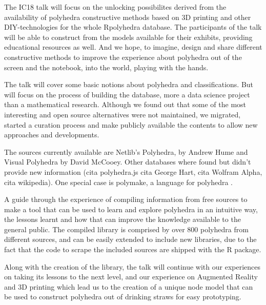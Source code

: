 \documentclass[a4paper,10pt]{article}
\begin{document}
The IC18 talk will focus on the unlocking possibilites derived from the availability of polyhedra constructive methods based on 3D printing and other DIY-technologies for the whole Rpolyhedra database. The participants of the talk will be able to construct from the models available for their exhibits, providing educational resources as well. And we hope, to imagine, design and share different constructive methods to improve the experience about polyhedra out of the screen and the notebook, into the world, playing with the hands.

The talk will cover some basic notions about polyhedra and classifications. But will focus on the process of building the database, more a data science project than a mathematical research. Although we found out that some of the most interesting and open source alternatives were not maintained, we migrated, started a curation process and make publicly available the contents to allow new approaches and developments.

The sources currently available are Netlib's Polyhedra\cite{NETLIB}, by Andrew Hume and Visual Polyhedra\cite{DMCCOOEY} by David McCooey. Other databases where found but didn't provide new information (cita polyhedra.js cita George Hart, cita Wolfram Alpha, cita wikipedia). One special case is polymake, a language for polyhedra .

A guide through the experience of compiling information from free sources to make a tool that can be used to learn and explore polyhedra in an intuitive way, the lessons learnt and how that can improve the knowledge available to the general public. The compiled library is comprised by over 800 polyhedra from different sources, and can be easily extended to include new libraries, due to the fact that the code to scrape the included sources are shipped with the R package. 

Along with the creation of the library, the talk will continue with our experiences on taking its lessons to the next level, and our experience on Augmented Reality and 3D printing which lead us to the creation of a unique node model that can be used to construct polyhedra out of drinking straws for easy prototyping.  



\end{document}
